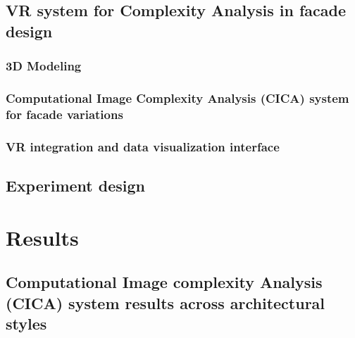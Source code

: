 \documentclass[final,5p,times]{elsarticle}
\begin{document}
\begin{linenumbers}
    \subsection{VR system for Complexity Analysis in facade design}
    \label{subsec:VRsystemDevelopment}
    

        \subsubsection{3D Modeling}
        \label{subsubsec:Modeling}
        

        \subsubsection{Computational Image Complexity Analysis (CICA) system for facade variations}
        \label{subsubsec:CICAforFacades}
        

        \subsubsection{VR integration and data visualization interface}
        \label{subsubsec:VR_integration}
        

    \subsection{Experiment design}
    \label{subsec:Experiment_design}
    

\section{Results}
\label{sec:Results}


    \subsection{Computational Image complexity Analysis (CICA) system results across architectural styles}
    \label{subsec:ResultsComplexityImageAnalysishistory}
    


\end{linenumbers}
\end{document}
